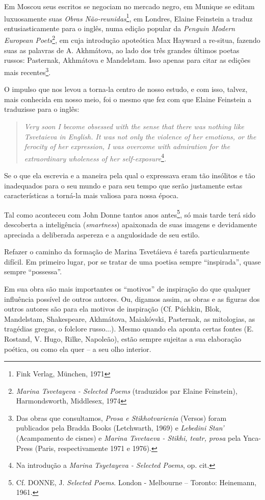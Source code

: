 Em Moscou seus escritos se negociam no mercado negro, em Munique se
editam luxuosamente suas \emph{Obras Não-reunidas}\footnote{Fink Verlag,
  München, 1971}, em Londres, Elaine Feinstein a traduz
entusiasticamente para o inglês, numa edição popular da \emph{Penguin
Modern European Poets}\footnote{\emph{Marina Tsvetayeva - Selected
  Poems} (traduzidos par Elaine Feinstein), Harmondsworth, Middlesex,
  1974}, em cuja introdução apoteótica Max Hayward a re-situa, fazendo
suas as palavras de A. Akhmátova, ao lado dos três grandes últimos
poetas russos: Pasternak, Akhmátova e Mandelstam. Isso apenas para citar
as edições mais recentes\footnote{Das obras que consultamos, \emph{Prosa
  e Stikhotvarienia} (Versos) foram publicados pela Bradda Books
  (Letchwarth, 1969) e \emph{Lebedini Stan'} (Acampamento de cisnes) e
  \emph{Marina Tsvetaeva - Stikhi, teatr, prosa} pela Ynca-Press (Paris,
  respectivamente 1971 e 1976).}.

O impulso que nos levou a torna-la centro de nosso estudo, e com isso,
talvez, mais conhecida em nosso meio, foi o mesmo que fez com que Elaine
Feinstein a traduzisse para o inglês:

\begin{quote}
\emph{Very soon I become obsessed with the sense that there was nothing
like Tsvetaieva in English. It was not only the violence of her
emotions, or the ferocity of her expression, I was overcome with
admiration for the extraordinary wholeness of her
self-exposure}\footnote{Na introdução a \emph{Marina} \emph{Tsyetayeva -
  Selected Poems}, op. cit.}\emph{.}
\end{quote}

Se o que ela escrevia e a maneira pela qual o expressava eram tão
insólitos e tão inadequados para o seu mundo e para seu tempo que serão
justamente estas características a torná-la mais valiosa para nossa
época.

Tal como aconteceu com John Donne tantos anos antes\footnote{Cf. DONNE,
  J. \emph{Selected Poems}. London - Melbourne -- Toronto: Heinemann,
  1961.}, só mais tarde terá sido descoberta a inteligência
(\emph{smartness}) apaixonada de suas imagens e devidamente apreciada a
deliberada aspereza e a angulosidade de seu estilo.

Refazer o caminho da formação de Marina Tsvetáieva é tarefa
particularmente difícil. Em primeiro lugar, por se tratar de uma poetisa
sempre ``inspirada'', quase sempre ``possessa''.

Em sua obra são mais importantes os ``motivos'' de inspiração do que
qualquer influência possível de outros autores. Ou, digamos assim, as
obras e as figuras dos outros autores são para ela motivos de inspiração
(Cf. Púchkin, Blok, Mandelstam, Shakespeare, Akhmátova, Maiakóvski,
Pasternak, as mitologias, as tragédias gregas, o folclore russo...).
Mesmo quando ela aponta certas fontes (E. Rostand, V. Hugo, Rilke,
Napoleão), estão sempre sujeitas a sua elaboração poética, ou como ela
quer -- a seu olho interior.

